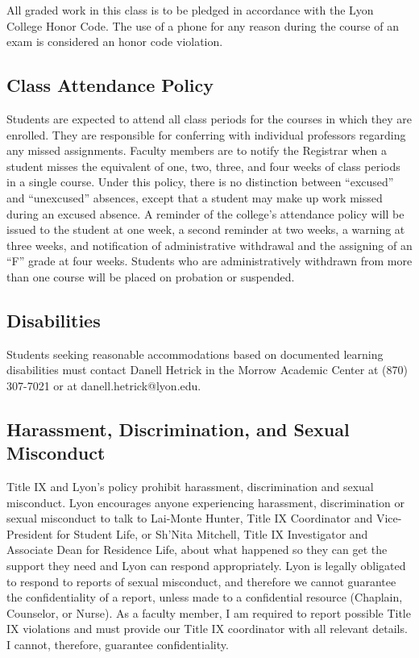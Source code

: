 \documentclass[11pt]{article}
\begin{document}
All graded work in this class is to be pledged in accordance with
the Lyon College Honor Code. The use of a phone for any reason
during the course of an exam is considered an honor code
violation.

\subsection{Class Attendance Policy}
\label{sec:org67576e5}

Students are expected to attend all class periods for the courses
in which they are enrolled. They are responsible for conferring
with individual professors regarding any missed
assignments. Faculty members are to notify the Registrar when a
student misses the equivalent of one, two, three, and four weeks
of class periods in a single course. Under this policy, there is
no distinction between “excused” and “unexcused” absences, except
that a student may make up work missed during an excused
absence. A reminder of the college’s attendance policy will be
issued to the student at one week, a second reminder at two weeks,
a warning at three weeks, and notification of administrative
withdrawal and the assigning of an “F” grade at four
weeks. Students who are administratively withdrawn from more than
one course will be placed on probation or suspended.

\subsection{Disabilities}
\label{sec:org738bb00}

Students seeking reasonable accommodations based on documented
learning disabilities must contact Danell Hetrick in the Morrow
Academic Center at (870) 307-7021 or at danell.hetrick@lyon.edu.

\subsection{Harassment, Discrimination, and Sexual Misconduct}
\label{sec:orgb5e9e5d}

Title IX and Lyon’s policy prohibit harassment, discrimination and
sexual misconduct. Lyon encourages anyone experiencing harassment,
discrimination or sexual misconduct to talk to Lai-Monte Hunter,
Title IX Coordinator and Vice-President for Student Life, or
Sh’Nita Mitchell, Title IX Investigator and Associate Dean for
Residence Life, about what happened so they can get the support
they need and Lyon can respond appropriately.  Lyon is legally
obligated to respond to reports of sexual misconduct, and
therefore we cannot guarantee the confidentiality of a report,
unless made to a confidential resource (Chaplain, Counselor, or
Nurse). As a faculty member, I am required to report possible
Title IX violations and must provide our Title IX coordinator with
all relevant details.  I cannot, therefore, guarantee
confidentiality.
\end{document}
